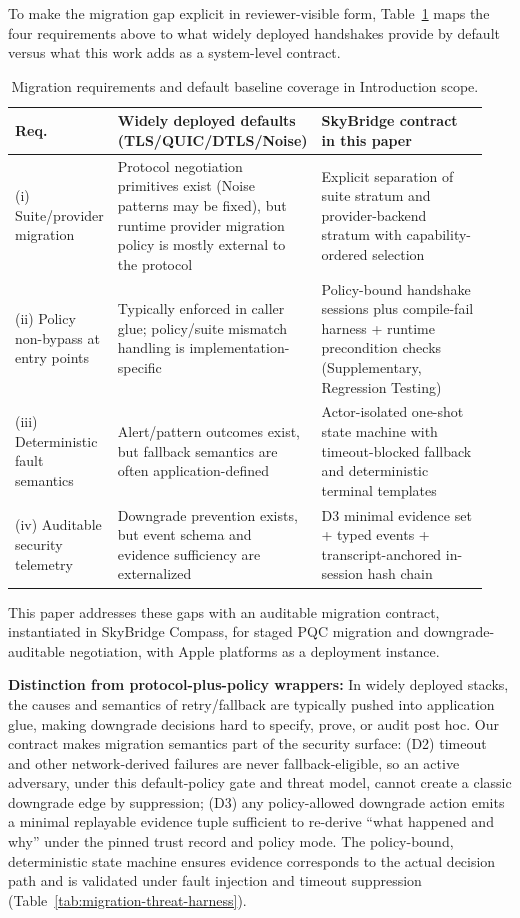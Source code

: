 \documentclass[10pt,journal,compsoc]{IEEEtran}
\begin{document}
To make the migration gap explicit in reviewer-visible form,
Table~\ref{tab:intro-migration-gap} maps the four requirements above to
what widely deployed handshakes provide by default versus what this work
adds as a system-level contract.

\begin{table}[!t]
\centering
\scriptsize
\caption{Migration requirements and default baseline coverage in Introduction scope.}
\label{tab:intro-migration-gap}
\begingroup
\setlength{\tabcolsep}{2pt}
\begin{tabular}{@{}p{0.16\linewidth}p{0.39\linewidth}p{0.39\linewidth}@{}}
\toprule
Req. & Widely deployed defaults (TLS/QUIC/DTLS/Noise) & SkyBridge contract in this paper \\
\midrule
(i) Suite/provider migration & Protocol negotiation primitives exist (Noise patterns may be fixed), but runtime provider migration policy is mostly external to the protocol & Explicit separation of suite stratum and provider-backend stratum with capability-ordered selection \\
(ii) Policy non-bypass at entry points & Typically enforced in caller glue; policy/suite mismatch handling is implementation-specific & Policy-bound handshake sessions plus compile-fail harness + runtime precondition checks (Supplementary, Regression Testing) \\
(iii) Deterministic fault semantics & Alert/pattern outcomes exist, but fallback semantics are often application-defined & Actor-isolated one-shot state machine with timeout-blocked fallback and deterministic terminal templates \\
(iv) Auditable security telemetry & Downgrade prevention exists, but event schema and evidence sufficiency are externalized & D3 minimal evidence set + typed events + transcript-anchored in-session hash chain \\
\bottomrule
\end{tabular}
\endgroup
\end{table}

This paper addresses these gaps with an auditable migration contract,
instantiated in SkyBridge Compass, for staged PQC migration and
downgrade-auditable negotiation, with Apple platforms as a deployment
instance.

\textbf{Distinction from protocol-plus-policy wrappers:} In widely
deployed stacks, the causes and semantics of retry/fallback are
typically pushed into application glue, making downgrade decisions hard
to specify, prove, or audit post hoc. Our contract makes migration
semantics part of the security surface: (D2) timeout and other
network-derived failures are never fallback-eligible, so an active
adversary, under this default-policy gate and threat model, cannot
create a classic downgrade edge by suppression; (D3)
any policy-allowed downgrade action emits a minimal replayable evidence
tuple sufficient to re-derive ``what happened and why'' under the pinned
trust record and policy mode. The policy-bound, deterministic state
machine ensures evidence corresponds to the actual decision path and is
validated under fault injection and timeout suppression
(Table~\ref{tab:migration-threat-harness}).
\end{document}
